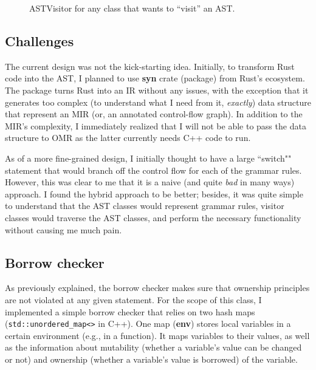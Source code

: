 \begin{figure*}[ht]
    \begin{center}
        
    \end{center}
    \caption{ASTVisitor for any class that wants to ``visit'' an AST.}
    \label{cpp2}
\end{figure*}

\subsection{Challenges}

The current design was not the kick-starting idea. Initially, to transform Rust
code into the AST, I planned to use \textbf{syn} crate (package) from Rust's
ecosystem.  The package turns Rust into an IR without any issues, with the
exception that it generates too complex (to understand what I need from it,
\textit{exactly}) data structure that represent an MIR (or, an annotated
control-flow graph). In addition to the MIR's complexity, I immediately
realized that I will not be able to pass the data structure
to OMR as the latter currently needs C++ code to run.

As of a more fine-grained design, I initially thought to
have a large ``switch"" statement that would branch off
the control flow for each of the grammar rules. However,
this was clear to me that it is a naive (and quite \textit{bad} in many ways)
approach. I found the hybrid approach to be better; besides,
it was quite simple to understand that the AST classes would
represent grammar rules, visitor classes would traverse the AST
classes, and perform the necessary functionality without causing me much
pain.

\subsection{Borrow checker}

As previously explained, the borrow checker makes sure that
ownership principles are not violated at any given statement.
For the scope of this class, I implemented a simple borrow checker
that relies on two hash maps (\texttt{std::unordered\_map<>} in C++).
One map (\textbf{env}) stores local variables in a certain environment
(e.g., in a function). It maps variables to their values, as well as
the information about mutability (whether a variable's
value can be changed or not) and ownership (whether a variable's value is
borrowed) of the variable.

